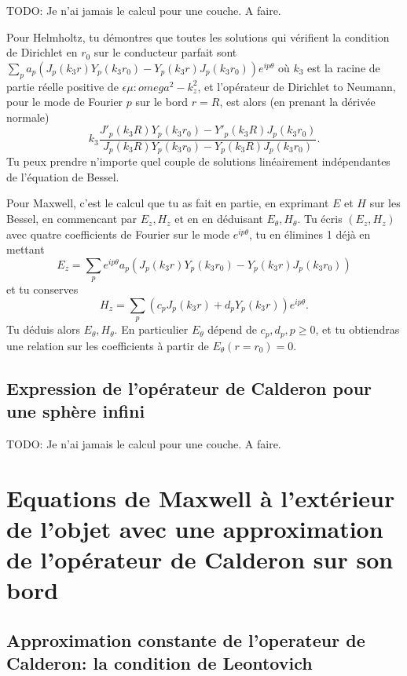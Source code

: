 \documentclass[12pt,%
    twoside,%
    a4paper,%
    openright, %
    ]{book}
\numberwithin{equation}{section} %
\renewcommand{\frac}[2]{\dfrac{#1}{#2}} %
\newcounter{REM}
\newenvironment{REM}[1][\theREM]
    {%
        \stepcounter{REM}
        \hypertarget{REM#1}{}%
        \pdfbookmark[0]{REM \theREM}{REM#1}
        \begin{tcolorbox}[%
                title={Remarque \theREM},%
                colback=red!30!white,%
                colframe=red!75!black,%
            ]
    }
    {
        \end{tcolorbox}%
    }%
\begin{document}
        \begin{REM}
            TODO: Je n'ai jamais le calcul pour une couche. A faire.
        \end{REM}
        \begin{REM}
        Pour Helmholtz, tu démontres que toutes les solutions qui vérifient la condition de Dirichlet en $r_0$ sur le conducteur parfait sont $\sum_p a_p(J_p(k_3r)Y_p(k_3r_0)-Y_p(k_3r)J_p(k_3r_0))e^{ip\theta}$ où $k_3$ est la racine de partie réelle positive de $\epsilon \mu :omega^2-k_z^2$, et l'opérateur de Dirichlet to Neumann, pour le mode de Fourier $p$ sur le bord $r=R$, est alors (en prenant la dérivée normale)
        $$k_3\frac{J'_p(k_3R)Y_p(k_3r_0)-Y'_p(k_3R)J_p(k_3r_0)}{J_p(k_3R)Y_p(k_3r_0)-Y_p(k_3R)J_p(k_3r_0)}.$$
        Tu peux prendre n'importe quel couple de solutions linéairement indépendantes de l'équation de Bessel.
        
        Pour Maxwell, c'est le calcul que tu as fait en partie, en exprimant $E$ et $H$ sur les Bessel, en commencant par $E_z,H_z$ et en en déduisant $E_{\theta}, H_{\theta}$. Tu écris $(E_z, H_z)$ avec quatre coefficients de Fourier sur le mode $e^{ip\theta}$, tu en élimines 1 déjà en mettant
        $$E_z=\sum_p e^{ip\theta}a_p(J_p(k_3r)Y_p(k_3r_0)-Y_p(k_3r)J_p(k_3r_0))$$
        et tu conserves
        $$H_z=\sum_p (c_pJ_p(k_3r)+d_pY_p(k_3r))e^{ip\theta}.$$
        Tu déduis alors $E_{\theta}, H_{\theta}$. En particulier $E_{\theta}$ dépend de $c_p, d_p, p\geq 0$, et tu obtiendras une relation sur les coefficients à partir de $E_{\theta}(r=r_0)=0$. 
        \end{REM}

    \subsection{Expression de l'opérateur de Calderon pour une sphère infini}

        \begin{REM}
            TODO: Je n'ai jamais le calcul pour une couche. A faire.
        \end{REM}

\section{Equations de Maxwell à l'extérieur de l'objet avec une approximation de l'opérateur de Calderon sur son bord}

    \subsection{Approximation constante de l'operateur de Calderon: la condition de Leontovich}
        
\end{document}
